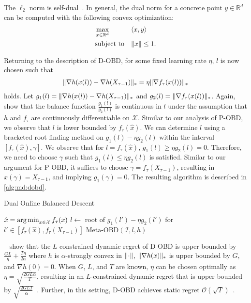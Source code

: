 The $\ell_2$ norm is self-dual~\cite{Gupta2020}. In general, the dual norm for a concrete point $y \in \mathbb{R}^d$ can be computed with the following convex optimization: \begin{align*}
    &\max_{x \in \mathbb{R}^d} &&\langle x, y \rangle \\
    &\text{subject to}         &&\lVert x\rVert \leq 1.
\end{align*}

Returning to the description of D-OBD, for some fixed learning rate $\eta$, $l$ is now chosen such that \begin{align*}
    \lVert\nabla h(x(l)) - \nabla h(X_{\tau-1})\rVert_* = \eta \lVert\nabla f_{\tau}(x(l))\rVert_*
\end{align*} holds. Let $g_1(l) = \lVert\nabla h(x(l)) - \nabla h(X_{\tau-1})\rVert_*$ and $g_2(l) = \lVert\nabla f_{\tau}(x(l))\rVert_*$. Again, \citeauthor*{Goel2018}~\cite{Goel2018} show that the balance function $\frac{g_1(l)}{g_2(l)}$ is continuous in $l$ under the assumption that $h$ and $f_{\tau}$ are continuously differentiable on $\mathcal{X}$. Similar to our analysis of P-OBD, we observe  that $l$ is lower bounded by $f_{\tau}(\hat{x})$. We can determine $l$ using a bracketed root finding method on $g_1(l) - \eta g_2(l)$ within the interval $[f_{\tau}(\hat{x}), \gamma]$. We observe that for $l = f_{\tau}(\hat{x})$, $g_1(l) \geq \eta g_2(l) = 0$. Therefore, we need to choose $\gamma$ such that $g_1(l) \leq \eta g_2(l)$ is satisfied. Similar to our argument for P-OBD, it suffices to choose $\gamma = f_{\tau}(X_{\tau-1})$, resulting in $x(\gamma) = X_{\tau-1}$, and implying $g_1(\gamma) = 0$. The resulting algorithm is described in \cref{alg:md:dobd}.

\begin{algorithm}
    \caption{Dual Online Balanced Descent~\cite{Goel2018}}\label{alg:md:dobd}
    $\hat{x} = \operatorname*{arg\,min}_{x \in \mathcal{X}} f_{\tau}(x)$\;
    $l \gets $ root of $g_1(l') - \eta g_2(l')$ for $l' \in [f_{\tau}(\hat{x}), f_{\tau}(X_{\tau-1})]$\;
    \Return $\text{Meta-OBD}(\mathcal{I}, l, h)$\;
\end{algorithm}

\citeauthor*{Goel2018}~\cite{Goel2018} show that the $L$-constrained dynamic regret of D-OBD is upper bounded by $\frac{G L}{\eta} + \frac{T \eta}{2 \alpha}$ where $h$ is $\alpha$-strongly convex in $\lVert\cdot\rVert$, $\lVert\nabla h(x)\rVert_*$ is upper bounded by $G$, and $\nabla h(0) = 0$. When $G$, $L$, and $T$ are known, $\eta$ can be chosen optimally as $\eta = \sqrt{\frac{2 G L \alpha}{T}}$, resulting in an $L$-constrained dynamic regret that is upper bounded by $\sqrt{\frac{2 G L T}{\alpha}}$~\cite{Goel2018}. Further, in this setting, D-OBD achieves static regret $\mathcal{O}(\sqrt{T})$~\cite{Goel2018}.


